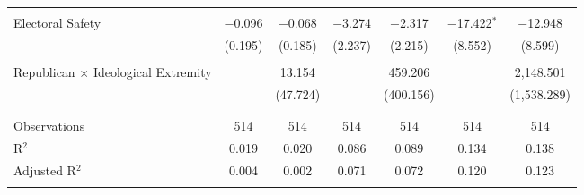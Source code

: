 \begin{tabular}{@{\extracolsep{5pt}}lcccccc}
  & & & & & & \\ 
 Electoral Safety & $-$0.096 & $-$0.068 & $-$3.274 & $-$2.317 & $-$17.422$^{*}$ & $-$12.948 \\ 
  & (0.195) & (0.185) & (2.237) & (2.215) & (8.552) & (8.599) \\ 
  & & & & & & \\ 
 Republican $\times$ Ideological Extremity &  & 13.154 &  & 459.206 &  & 2,148.501 \\ 
  &  & (47.724) &  & (400.156) &  & (1,538.289) \\ 
  & & & & & & \\ 
\hline \\[-1.8ex] 
Observations & 514 & 514 & 514 & 514 & 514 & 514 \\ 
R$^{2}$ & 0.019 & 0.020 & 0.086 & 0.089 & 0.134 & 0.138 \\ 
Adjusted R$^{2}$ & 0.004 & 0.002 & 0.071 & 0.072 & 0.120 & 0.123 \\ 
\hline 
\hline \\[-1.8ex] 
\end{tabular} 
